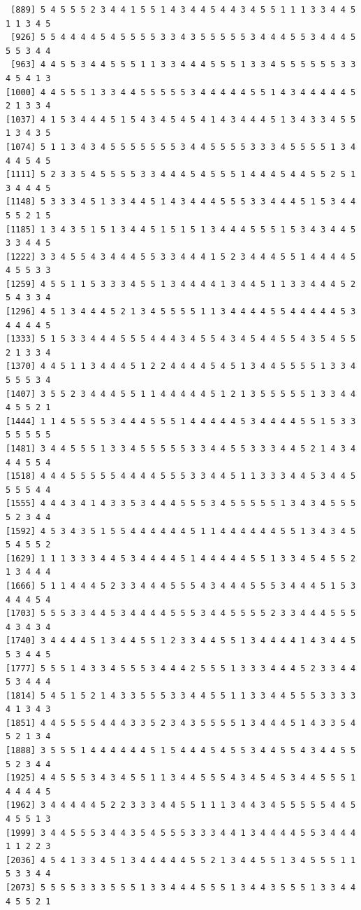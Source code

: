 \documentclass[
  letterpaper,
  DIV=11,
  numbers=noendperiod]{scrreprt}
\begin{document}
\begin{verbatim}
 [889] 5 4 5 5 5 2 3 4 4 1 5 5 1 4 3 4 4 5 4 4 3 4 5 5 1 1 1 3 3 4 4 5 1 1 3 4 5
 [926] 5 5 4 4 4 4 5 4 5 5 5 5 3 3 4 3 5 5 5 5 5 3 4 4 4 5 5 3 4 4 4 5 5 5 3 4 4
 [963] 4 4 5 5 3 4 4 5 5 5 1 1 3 3 4 4 4 5 5 5 1 3 3 4 5 5 5 5 5 5 3 3 4 5 4 1 3
[1000] 4 4 5 5 5 1 3 3 4 4 5 5 5 5 5 3 4 4 4 4 4 5 5 1 4 3 4 4 4 4 4 5 2 1 3 3 4
[1037] 4 1 5 3 4 4 4 5 1 5 4 3 4 5 4 5 4 1 4 3 4 4 4 5 1 3 4 3 3 4 5 5 1 3 4 3 5
[1074] 5 1 1 3 4 3 4 5 5 5 5 5 5 5 3 4 4 5 5 5 5 3 3 3 4 5 5 5 5 1 3 4 4 4 5 4 5
[1111] 5 2 3 3 5 4 5 5 5 5 3 3 4 4 4 5 4 5 5 5 1 4 4 4 5 4 4 5 5 2 5 1 3 4 4 4 5
[1148] 5 3 3 3 4 5 1 3 3 4 4 5 1 4 3 4 4 4 5 5 5 3 3 4 4 4 5 1 5 3 4 4 5 5 2 1 5
[1185] 1 3 4 3 5 1 5 1 3 4 4 5 1 5 1 5 1 3 4 4 4 5 5 5 1 5 3 4 3 4 4 5 3 3 4 4 5
[1222] 3 3 4 5 5 4 3 4 4 4 5 5 3 3 4 4 4 1 5 2 3 4 4 4 5 5 1 4 4 4 4 5 4 5 5 3 3
[1259] 4 5 5 1 1 5 3 3 3 4 5 5 1 3 4 4 4 4 1 3 4 4 5 1 1 3 3 4 4 4 5 2 5 4 3 3 4
[1296] 4 5 1 3 4 4 4 5 2 1 3 4 5 5 5 5 1 1 3 4 4 4 4 5 5 4 4 4 4 4 5 3 4 4 4 4 5
[1333] 5 1 5 3 3 4 4 4 5 5 5 4 4 4 3 4 5 5 4 3 4 5 4 4 5 5 4 3 5 4 5 5 2 1 3 3 4
[1370] 4 4 5 1 1 3 4 4 4 5 1 2 2 4 4 4 4 5 4 5 1 3 4 4 5 5 5 5 1 3 3 4 5 5 5 3 4
[1407] 3 5 5 2 3 4 4 4 5 5 1 1 4 4 4 4 4 5 1 2 1 3 5 5 5 5 5 1 3 3 4 4 4 5 5 2 1
[1444] 1 1 4 5 5 5 5 3 4 4 4 5 5 5 1 4 4 4 4 4 5 3 4 4 4 4 5 5 1 5 3 3 5 5 5 5 5
[1481] 3 4 4 5 5 5 1 3 3 4 5 5 5 5 5 3 3 4 4 5 5 3 3 3 4 4 5 2 1 4 3 4 4 4 5 5 4
[1518] 4 4 4 5 5 5 5 5 4 4 4 4 5 5 5 3 3 4 4 5 1 1 3 3 3 4 4 5 3 4 4 5 5 5 5 4 4
[1555] 4 4 4 3 4 1 4 3 3 5 3 4 4 4 5 5 5 3 4 5 5 5 5 5 1 3 4 3 4 5 5 5 5 2 3 4 4
[1592] 4 5 3 4 3 5 1 5 5 4 4 4 4 4 4 5 1 1 4 4 4 4 4 4 5 5 1 3 4 3 4 5 5 4 5 5 2
[1629] 1 1 1 3 3 3 4 4 5 3 4 4 4 4 5 1 4 4 4 4 4 5 5 1 3 3 4 5 4 5 5 2 1 3 4 4 4
[1666] 5 1 1 4 4 4 5 2 3 3 4 4 4 5 5 5 4 3 4 4 4 5 5 5 3 4 4 4 5 1 5 3 4 4 4 5 4
[1703] 5 5 5 3 3 4 4 5 3 4 4 4 4 5 5 5 3 4 4 5 5 5 5 2 3 3 4 4 4 5 5 5 4 3 4 3 4
[1740] 3 4 4 4 4 5 1 3 4 4 5 5 1 2 3 3 4 4 5 5 1 3 4 4 4 4 1 4 3 4 4 5 5 3 4 4 5
[1777] 5 5 5 1 4 3 3 4 5 5 5 3 4 4 4 2 5 5 5 1 3 3 3 4 4 4 5 2 3 3 4 4 5 3 4 4 4
[1814] 5 4 5 1 5 2 1 4 3 3 5 5 5 3 3 4 4 5 5 1 1 3 3 4 4 5 5 5 3 3 3 3 4 1 3 4 3
[1851] 4 4 5 5 5 5 4 4 4 3 3 5 2 3 4 3 5 5 5 5 1 3 4 4 4 5 1 4 3 3 5 4 5 2 1 3 4
[1888] 3 5 5 5 1 4 4 4 4 4 4 5 1 5 4 4 4 5 4 5 5 3 4 4 5 5 4 3 4 4 5 5 5 2 3 4 4
[1925] 4 4 5 5 5 3 4 3 4 5 5 1 1 3 4 4 5 5 5 4 3 4 5 4 5 3 4 4 5 5 5 1 4 4 4 4 5
[1962] 3 4 4 4 4 4 5 2 2 3 3 3 4 4 5 5 1 1 1 3 4 4 3 4 5 5 5 5 5 4 4 5 4 5 5 1 3
[1999] 3 4 4 5 5 5 3 4 4 3 5 4 5 5 5 3 3 3 4 4 1 3 4 4 4 4 5 5 3 4 4 4 1 1 2 2 3
[2036] 4 5 4 1 3 3 4 5 1 3 4 4 4 4 4 5 5 2 1 3 4 4 5 5 1 3 4 5 5 5 1 1 5 3 3 4 4
[2073] 5 5 5 5 3 3 3 5 5 5 1 3 3 4 4 4 5 5 5 1 3 4 4 3 5 5 5 1 3 3 4 4 4 5 5 2 1

\end{verbatim}
\end{document}
